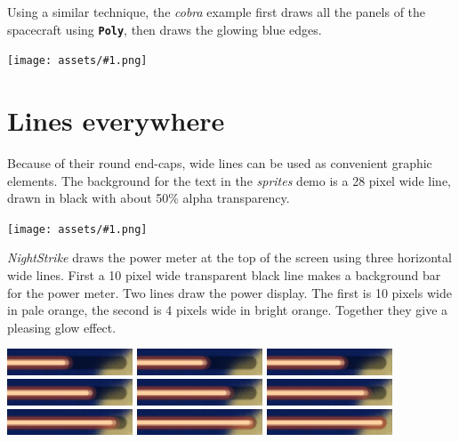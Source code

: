 \documentclass[10pt]{book}
\newcommand{\png}[1]{
\begin{center}
\texttt{[image: assets/\#1.png]}
\end{center}
}
\newcommand{\mach}[1]{\texttt{\textbf{#1}}}
\begin{document}
Using a similar technique, the \textit{cobra} example
first draws all the panels of the spacecraft using
\mach{Poly},
then draws the glowing blue edges.
\png{cobra}

\newpage
\section{Lines everywhere}

Because of their round end-caps, wide lines can be used as convenient graphic elements.
The background for the text in the \textit{sprites} demo is a 28 pixel wide line,
drawn in black with about 50\% alpha transparency.
\png{lines-el}

\textit{NightStrike} draws the power meter at the top of the screen
using three horizontal wide lines.
First a 10 pixel wide transparent black line makes a background bar for the power meter.
Two lines draw the power display.
The first is 10 pixels wide in pale orange, the second is 4 pixels wide in bright orange.
Together they give a pleasing glow effect.

\begin{center}
\includegraphics[width=0.28\textwidth]{assets/ns-pwr-0000.png}
\includegraphics[width=0.28\textwidth]{assets/ns-pwr-0001.png}
\includegraphics[width=0.28\textwidth]{assets/ns-pwr-0002.png}
\includegraphics[width=0.28\textwidth]{assets/ns-pwr-0003.png}
\includegraphics[width=0.28\textwidth]{assets/ns-pwr-0004.png}
\includegraphics[width=0.28\textwidth]{assets/ns-pwr-0005.png}
\includegraphics[width=0.28\textwidth]{assets/ns-pwr-0006.png}
\includegraphics[width=0.28\textwidth]{assets/ns-pwr-0007.png}
\includegraphics[width=0.28\textwidth]{assets/ns-pwr-0008.png}
\end{center}
\end{document}
